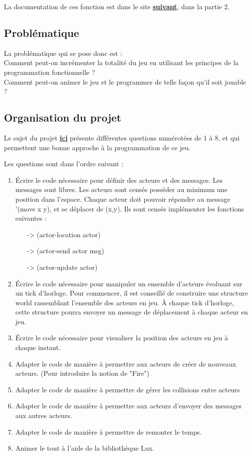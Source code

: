 \documentclass[a4paper]{article}
\begin{document}
La documentation de ces fonction est dans le site \href{https://docs.racket-lang.org/lux/index.html?q=world-tick}{\textbf{suivant}}, dans la partie 2.

\subsection{Problématique}
La problématique qui se pose donc est : \\
Comment peut-on incrémenter la totalité du jeu en utilisant les principes de la programmation fonctionnelle ? \\
Comment peut-on animer le jeu et le programmer de telle façon qu'il soit jouable ?

\subsection{Organisation du projet}
Le sujet du projet \href{https://www.labri.fr/perso/renault/working/teaching/projets/2019-20-S6-Scheme-Actors.php}{\textbf{ici}} présente différentes questions numérotées de 1 à 8, et qui permettent une bonne approche à la programmation de ce jeu.

Les questions sont dans l'ordre suivant :
\begin{enumerate}
    \item Écrire le code nécessaire pour définir des acteurs et des messages. Les messages sont libres. Les acteurs sont censés posséder au minimum une position dans l'espace. Chaque acteur doit pouvoir répondre au message '(move x y), et se déplacer de (x,y). Ils sont censés implémenter les fonctions suivantes :
    \begin{itemize}
        \item[->] (actor-location actor)
        \item[->] (actor-send actor msg)
        \item[->] (actor-update actor)
    \end{itemize}
    \item Écrire le code nécessaire pour manipuler un ensemble d'acteurs évoluant sur un tick d'horloge. Pour commencer, il est conseillé de construire une structure world rassemblant l'ensemble des acteurs en jeu. À chaque tick d'horloge, cette structure pourra envoyer un message de déplacement à chaque acteur en jeu.
    \item Écrire le code nécessaire pour visualiser la position des acteurs en jeu à chaque instant.
    \item Adapter le code de manière à permettre aux acteurs de créer de nouveaux acteurs. (Pour introduire la notion de "Fire")
    \item Adapter le code de manière à permettre de gérer les collisions entre acteurs
    \item Adapter le code de manière à permettre aux acteurs d'envoyer des messages aux autres acteurs.
    \item Adapter le code de manière à permettre de remonter le temps.
    \item Animer le tout à l'aide de la bibliothèque Lux.
\end{enumerate}
\end{document}
